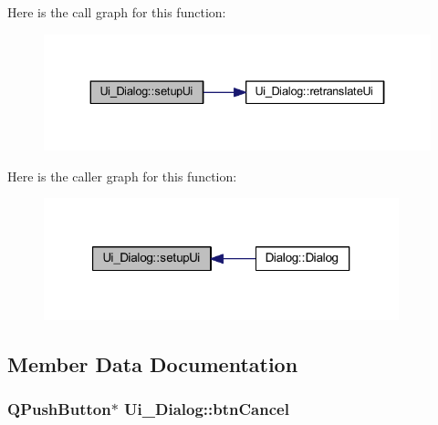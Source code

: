 Here is the call graph for this function\+:
\nopagebreak
\begin{figure}[H]
\begin{center}
\leavevmode
\includegraphics[width=334pt]{df/d1e/class_ui___dialog_a4f6a478c3ecdafabffb17b39cb26444a_cgraph}
\end{center}
\end{figure}




Here is the caller graph for this function\+:
\nopagebreak
\begin{figure}[H]
\begin{center}
\leavevmode
\includegraphics[width=292pt]{df/d1e/class_ui___dialog_a4f6a478c3ecdafabffb17b39cb26444a_icgraph}
\end{center}
\end{figure}




\subsection{Member Data Documentation}
\hypertarget{class_ui___dialog_a86e97ef07dc3416e5011fc86f69b4bcf}{}
\subsubsection[{btn\+Cancel}]{\setlength{\rightskip}{0pt plus 5cm}Q\+Push\+Button$\ast$ Ui\+\_\+\+Dialog\+::btn\+Cancel}\label{class_ui___dialog_a86e97ef07dc3416e5011fc86f69b4bcf}
\hypertarget{class_ui___dialog_adcea696e7dfb639f1b3e15cc828832aa}{}
